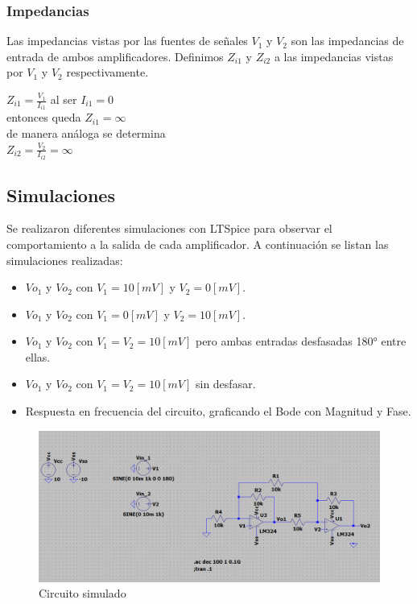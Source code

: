 \subsubsection{Impedancias}
Las impedancias vistas por las fuentes de señales $V_1$ y $V_2$ son las impedancias de entrada de ambos amplificadores. Definimos $Z_{i1}$ y $Z_{i2}$ a las impedancias vistas por $V_1$ y $V_2$ respectivamente.
\begin{center}
	$Z_{i1}= \frac{V_1}{I_{i1}}$ al ser $I_{i1}=0$ \\
	entonces queda $Z_{i1}= \infty$\\
	de manera análoga se determina\\
	 $Z_{i2}=\frac{V_2}{I_{i2}}=\infty$
\end{center}
\subsection{Simulaciones}
Se realizaron diferentes simulaciones con LTSpice para observar el comportamiento a la salida de cada amplificador. A continuación se listan las simulaciones realizadas:
\begin{itemize}
	\item $Vo_1$ y $Vo_2$ con $V_1=10[mV]$ y $V_2=0[mV]$.
	\item $Vo_1$ y $Vo_2$ con $V_1=0[mV]$ y $V_2=10[mV]$.
	\item $Vo_1$ y $Vo_2$ con $V_1 = V_2 = 10[mV]$ pero ambas entradas desfasadas 180° entre ellas.
	\item $Vo_1$ y $Vo_2$ con $V_1=V_2=10[mV]$ sin desfasar.
	\item Respuesta en frecuencia del circuito, graficando el Bode con Magnitud y Fase.
\end{itemize}
\begin{figure}[H]
	\centering
	\includegraphics[width=1\textwidth]{figuras/circuito1.png}
	\caption{Circuito simulado}
\end{figure}
